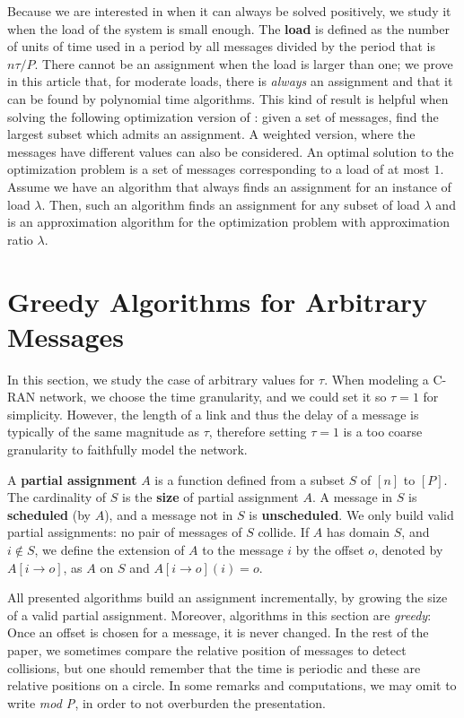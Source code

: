\documentclass[pdflatex,sn-mathphys,iicol]{sn-jnl}%
\theoremstyle{thmstyleone}%
\theoremstyle{thmstyletwo}%
\theoremstyle{thmstylethree}%
\begin{document}
Because we are interested in \pma when it can always be solved positively, we study it when the load of the system is small enough. The \textbf{load} is defined as the number of units of time used in a period by all messages divided by the period that is $n\tau /P$. There cannot be an assignment when the load is larger than one; we prove in this article that, for moderate loads, there is \emph{always} an assignment and that it can be found by polynomial time algorithms. This kind of result is helpful when solving the following optimization version of \pma: given a set of messages, find the largest subset which admits an assignment. A weighted version, where the messages have different values can also be considered. An optimal solution to the optimization problem is a set of messages corresponding to a load of at most $1$. Assume we have an algorithm that always finds an assignment for an instance of load $\lambda$. Then, such an algorithm finds an assignment for any subset of load $\lambda$ and is an approximation algorithm for the optimization problem with approximation ratio $\lambda$.


\section{Greedy Algorithms for Arbitrary Messages} \label{sec:large}

In this section, we study the case of arbitrary values for $\tau$. When modeling a C-RAN network, we choose the time granularity, and we could set it so $\tau = 1$ for simplicity. However, the length of a link and thus the delay of a message is typically of the same magnitude as $\tau$, therefore setting $\tau = 1$ is a too coarse granularity to faithfully model the network.

A \textbf{partial assignment} $A$ is a function defined from a subset $S$ of $[n]$ to $[P]$.
The cardinality of $S$ is the \textbf{size} of partial assignment $A$. A message in $S$ is \textbf{scheduled} (by $A$), and a message not in $S$ is \textbf{unscheduled}. We only build valid partial assignments: no pair of messages of $S$ collide. If $A$ has domain $S$, and $i \notin S$, we define the extension of $A$ to the message $i$ by the offset $o$, denoted by $A[i \rightarrow o]$, as $A$ on $S$ and $A[i \rightarrow o](i) = o$.

All presented algorithms build an assignment incrementally, by growing the size of a valid partial assignment. Moreover, algorithms in this section are \emph{greedy}: Once an offset is chosen for a message, it is never changed. In the rest of the paper, we sometimes compare the relative position of messages to detect collisions, but one should remember that the time is periodic and these are relative positions on a circle. 
In some remarks and computations, we may omit to write \emph{mod P}, in order to not overburden the presentation.
\end{document}
